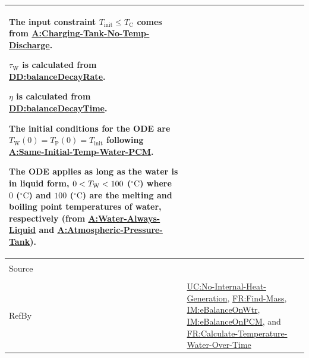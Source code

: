 \documentclass[12pt]{article}
\newcommand{\lt}{\ensuremath <}
\begin{document}
\begin{minipage}{\textwidth}
\begin{tabular}{>{\raggedright}p{}>{\raggedright\arraybackslash}p{}}
        The input constraint ${T_{\text{init}}}\leq{}{T_{\text{C}}}$ comes from \hyperref[assumpCTNOD]{A:Charging-Tank-No-Temp-Discharge}.
        
        ${τ_{\text{W}}}$ is calculated from \hyperref[DD:balanceDecayRate]{DD:balanceDecayRate}.
        
        $η$ is calculated from \hyperref[DD:balanceDecayTime]{DD:balanceDecayTime}.
        
        The initial conditions for the ODE are ${T_{\text{W}}}\left(0\right)={T_{\text{P}}}\left(0\right)={T_{\text{init}}}$ following \hyperref[assumpSITWP]{A:Same-Initial-Temp-Water-PCM}.
        
        The ODE applies as long as the water is in liquid form, $0\lt{}{T_{\text{W}}}\lt{}100$ (${{}^{\circ}\text{C}}$) where $0$ (${{}^{\circ}\text{C}}$) and $100$ (${{}^{\circ}\text{C}}$) are the melting and boiling point temperatures of water, respectively (from \hyperref[assumpWAL]{A:Water-Always-Liquid} and \hyperref[assumpAPT]{A:Atmospheric-Pressure-Tank}).
        
\\ \midrule \\
Source & \cite{koothoor2013}
         
\\ \midrule \\
RefBy & \hyperref[unlikeChgNIHG]{UC:No-Internal-Heat-Generation}, \hyperref[findMass]{FR:Find-Mass}, \hyperref[IM:eBalanceOnWtr]{IM:eBalanceOnWtr}, \hyperref[IM:eBalanceOnPCM]{IM:eBalanceOnPCM}, and \hyperref[calcTempWtrOverTime]{FR:Calculate-Temperature-Water-Over-Time}
        
\\ \bottomrule
\end{tabular}
\end{minipage}
\end{document}
